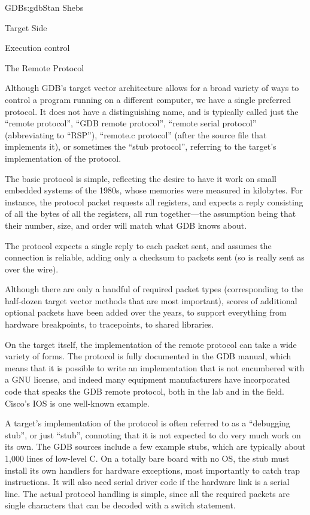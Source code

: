 \begin{aosachapter}{GDB}{s:gdb}{Stan Shebs}
\begin{aosasect1}{Target Side}
\begin{aosasect2}{Execution control}
\end{aosasect2}

\begin{aosasect2}{The Remote Protocol}

Although GDB's target vector architecture allows for a broad variety
of ways to control a program running on a different computer, we have
a single preferred protocol.  It does not have a distinguishing name,
and is typically called just the ``remote protocol'', ``GDB remote
protocol'', ``remote serial protocol'' (abbreviating to ``RSP''),
``remote.c protocol'' (after the source file that implements it), or
sometimes the ``stub protocol'', referring to the target's
implementation of the protocol.

The basic protocol is simple, reflecting the desire to have it work on
small embedded systems of the 1980s, whose memories were measured in
kilobytes.  For instance, the protocol packet  requests all
registers, and expects a reply consisting of all the bytes of all the
registers, all run together---the assumption being that their number,
size, and order will match what GDB knows about.

The protocol expects a single reply to each packet sent, and assumes
the connection is reliable, adding only a checksum to packets sent
(so  is really sent as  over the wire).

Although there are only a handful of required packet types
(corresponding to the half-dozen target vector methods that are most
important), scores of additional optional packets have been added over
the years, to support everything from hardware breakpoints, to
tracepoints, to shared libraries.

On the target itself, the implementation of the remote protocol can
take a wide variety of forms.  The protocol is fully documented in the
GDB manual, which means that it is possible to write an implementation
that is not encumbered with a GNU license, and indeed many equipment
manufacturers have incorporated code that speaks the GDB remote
protocol, both in the lab and in the field.  Cisco's IOS is one
well-known example.

A target's implementation of the protocol is often referred to as a
``debugging stub'', or just ``stub'', connoting that it is not expected
to do very much work on its own.  The GDB sources include a few
example stubs, which are typically about 1,000 lines of low-level C.
On a totally bare board with no OS, the stub must install its own
handlers for hardware exceptions, most importantly to catch trap
instructions.  It will also need serial driver code if the hardware
link is a serial line.  The actual protocol handling is simple, since
all the required packets are single characters that can be decoded
with a switch statement.


\end{aosasect2}
\end{aosasect1}
\end{aosachapter}

